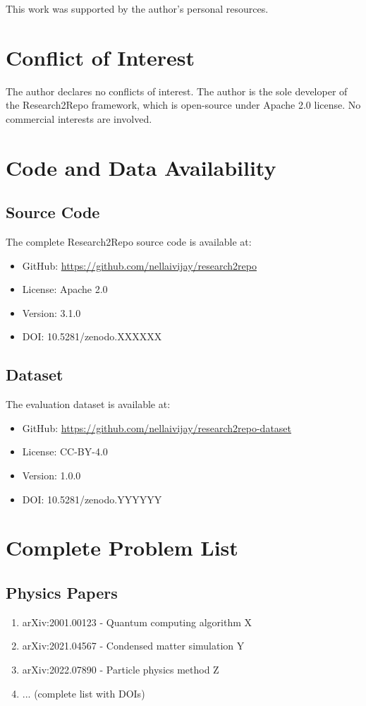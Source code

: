 \documentclass[10pt]{article}
\begin{document}
This work was supported by the author's personal resources.

\section*{Conflict of Interest}

The author declares no conflicts of interest. The author is the sole developer of the Research2Repo framework, which is open-source under Apache 2.0 license. No commercial interests are involved.

\appendix

\section{Code and Data Availability}

\subsection{Source Code}
The complete Research2Repo source code is available at:
\begin{itemize}
    \item GitHub: \url{https://github.com/nellaivijay/research2repo}
    \item License: Apache 2.0
    \item Version: 3.1.0
    \item DOI: 10.5281/zenodo.XXXXXX
\end{itemize}

\subsection{Dataset}
The evaluation dataset is available at:
\begin{itemize}
    \item GitHub: \url{https://github.com/nellaivijay/research2repo-dataset}
    \item License: CC-BY-4.0
    \item Version: 1.0.0
    \item DOI: 10.5281/zenodo.YYYYYY
\end{itemize}

\section{Complete Problem List}

\subsection{Physics Papers}
\begin{enumerate}
    \item arXiv:2001.00123 - Quantum computing algorithm X
    \item arXiv:2021.04567 - Condensed matter simulation Y
    \item arXiv:2022.07890 - Particle physics method Z
    \item ... (complete list with DOIs)
\end{enumerate}
\end{document}

